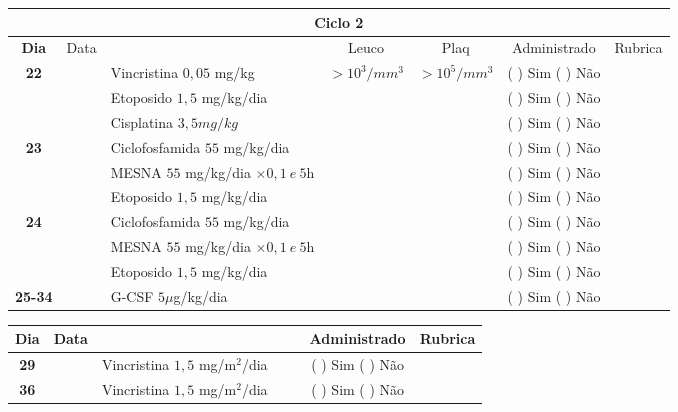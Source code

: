 \documentclass[11pt,a4paper,oldfontcommands]{memoir}
\begin{document}
\begin{center}
\begin{longtable}{p{1cm}c|p{4.64cm}|p{1.5cm}p{1.5cm}|c|c}
	\hline
	\multicolumn{7}{c}{Ciclo 2} \\
	\hline
	\multicolumn{1}{c|}{\multirow{1}{*}{\textbf{Dia}}}&{Data}&{}&\multicolumn{1}{c|}{Leuco}&\multicolumn{1}{c|}{Plaq}&{Administrado}&{Rubrica} \\
    \hline
    \multicolumn{1}{c|}{\multirow{3}{*}{\textbf{22}}}&&{Vincristina \(0,05\) mg/kg}&\multicolumn{1}{c|}{\(>10^3/mm^3\)}&\multicolumn{1}{c|}{\(>10^5/mm^3\)}&{(  ) Sim (  ) Não}&\\
    \cline{4-5}
    \multicolumn{1}{c|}{}&&{Etoposido \(1,5\) mg/kg/dia}&\multicolumn{1}{c|}{}&&{(  ) Sim (  ) Não}&\\
    \cline{4-5}
    \multicolumn{1}{c|}{}&\multirow{1}{*}{}&{Cisplatina \(3,5mg/kg\)}&&&{(  ) Sim (  ) Não}&\\
    \hline
    \multicolumn{1}{c|}{\multirow{3}{*}{\textbf{23}}}&&{Ciclofosfamida \(55\) mg/kg/dia}&{}&&{(  ) Sim (  ) Não}&\\
    \multicolumn{1}{c|}{}&&{MESNA \(55\) mg/kg/dia \(\times 0,1 \:e\: 5\)h}&&&{(  ) Sim (  ) Não}&\\
    \multicolumn{1}{c|}{}&&{Etoposido \(1,5\) mg/kg/dia}&&&{(  ) Sim (  ) Não}&\\
    \hline
    \multicolumn{1}{c|}{\multirow{3}{*}{\textbf{24}}}&&{Ciclofosfamida \(55\) mg/kg/dia}&{}&&{(  ) Sim (  ) Não}&\\
    \multicolumn{1}{c|}{}&&{MESNA \(55\) mg/kg/dia \(\times 0,1 \:e\: 5\)h}&&&{(  ) Sim (  ) Não}&\\
    \multicolumn{1}{c|}{}&\multirow{1}{*}{}&{Etoposido \(1,5\) mg/kg/dia}&{}&&{(  ) Sim (  ) Não}&\\
    \hline
    \multicolumn{1}{c|}{\textbf{25-34}}&&{G-CSF \(5 \mu\)g/kg/dia }&&&{(  ) Sim (  ) Não}&\\
    \hline
\end{longtable}
\begin{longtable}{p{1cm}c|p{4cm}|p{2cm}p{2cm}|c|c}
	\hline
	\multicolumn{1}{c|}{\multirow{1}{*}{\textbf{Dia}}}&{Data}&{}&{}&&{Administrado}&{Rubrica} \\
    \hline
    \multicolumn{1}{c|}{\textbf{29}}&&{Vincristina \(1,5\) mg/m\(^2\)/dia}&\multicolumn{1}{c}{}&&{(  ) Sim (  ) Não}&\\
    \hline
    \multicolumn{1}{c|}{\textbf{36}}&&{Vincristina \(1,5\) mg/m\(^2\)/dia}&\multicolumn{1}{c}{}&&{(  ) Sim (  ) Não}&\\
    \hline
\end{longtable}

\end{center}
\end{document}
